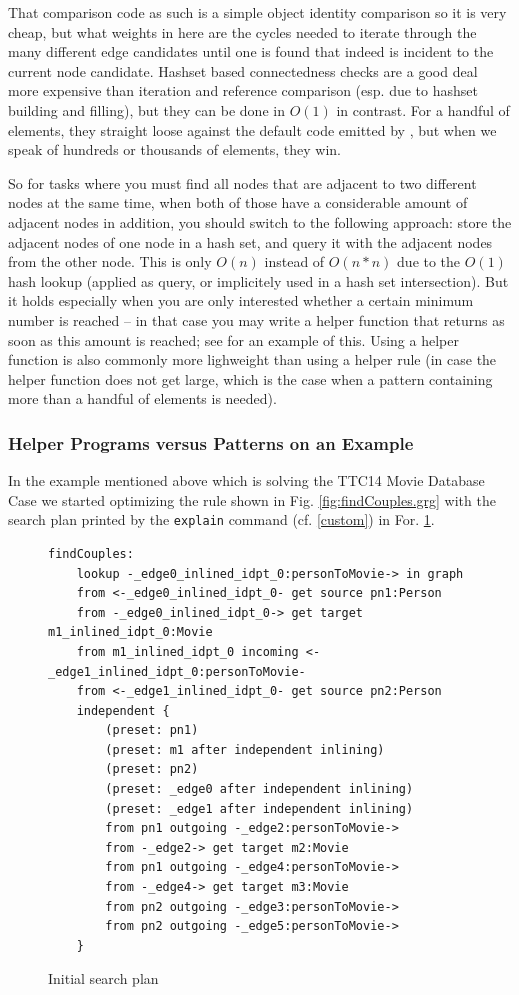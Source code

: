 That comparison code as such is a simple object identity comparison so it is very cheap, 
but what weights in here are the cycles needed to iterate through the many different edge candidates until one is found that indeed is incident to the current node candidate.
Hashset based connectedness checks are a good deal more expensive than iteration and reference comparison (esp. due to hashset building and filling), but they can be done in $O(1)$ in contrast.
For a handful of elements, they straight loose against the default code emitted by \GrG, but when we speak of hundreds or thousands of elements, they win.

So for tasks where you must find all nodes that are adjacent to two different nodes at the same time, when both of those have a considerable amount of adjacent nodes in addition, you should switch to the following approach:
store the adjacent nodes of one node in a hash set, and query it with the adjacent nodes from the other node.
This is only $O(n)$ instead of $O(n*n)$ due to the $O(1)$ hash lookup (applied as query, or implicitely used in a hash set intersection).
But it holds especially when you are only interested whether a certain minimum number is reached -- in that case you may write a helper function that returns as soon as this amount is reached; see \cite{MovieDatabase} for an example of this.
Using a helper function is also commonly more lighweight than using a helper rule (in case the helper function does not get large, which is the case when a pattern containing more than a handful of elements is needed).

\subsubsection*{Helper Programs versus Patterns on an Example}

In the example \cite{MovieDatabase} mentioned above which is solving the TTC14 Movie Database Case \cite{MovieDatabaseCase} we started optimizing the rule shown in Fig. \ref{fig:findCouples.grg}
with the search plan printed by the \texttt{explain} command (cf. \ref{custom}) in For. \ref{fig:InitialSP}.

\begin{figure}[h]
	\begin{verbatim}
findCouples:
    lookup -_edge0_inlined_idpt_0:personToMovie-> in graph
    from <-_edge0_inlined_idpt_0- get source pn1:Person
    from -_edge0_inlined_idpt_0-> get target m1_inlined_idpt_0:Movie
    from m1_inlined_idpt_0 incoming <-_edge1_inlined_idpt_0:personToMovie-
    from <-_edge1_inlined_idpt_0- get source pn2:Person
    independent {
        (preset: pn1)
        (preset: m1 after independent inlining)
        (preset: pn2)
        (preset: _edge0 after independent inlining)
        (preset: _edge1 after independent inlining)
        from pn1 outgoing -_edge2:personToMovie->
        from -_edge2-> get target m2:Movie
        from pn1 outgoing -_edge4:personToMovie->
        from -_edge4-> get target m3:Movie
        from pn2 outgoing -_edge3:personToMovie->
        from pn2 outgoing -_edge5:personToMovie->
    }
\end{verbatim}
	\caption{Initial search plan}
	\label{fig:InitialSP}
\end{figure}

